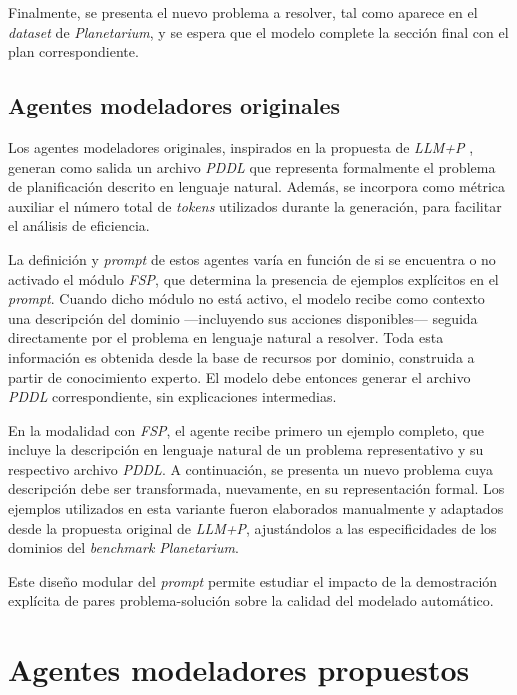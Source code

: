 Finalmente, se presenta el nuevo problema a resolver, tal como aparece en el \textit{dataset} de \textit{Planetarium}, y se espera que el modelo complete la sección final con el plan correspondiente.

\subsection{Agentes modeladores originales}

Los agentes modeladores originales, inspirados en la propuesta de \textit{LLM+P} \parencite{liu2023llm+}, generan como salida un archivo \textit{PDDL} que representa formalmente el problema de planificación descrito en lenguaje natural. Además, se incorpora como métrica auxiliar el número total de \textit{tokens} utilizados durante la generación, para facilitar el análisis de eficiencia.

La definición y \textit{prompt} de estos agentes varía en función de si se encuentra o no activado el módulo \textit{FSP}, que determina la presencia de ejemplos explícitos en el \textit{prompt}. Cuando dicho módulo no está activo, el modelo recibe como contexto una descripción del dominio —incluyendo sus acciones disponibles— seguida directamente por el problema en lenguaje natural a resolver. Toda esta información es obtenida desde la base de recursos por dominio, construida a partir de conocimiento experto. El modelo debe entonces generar el archivo \textit{PDDL} correspondiente, sin explicaciones intermedias.

En la modalidad con \textit{FSP}, el agente recibe primero un ejemplo completo, que incluye la descripción en lenguaje natural de un problema representativo y su respectivo archivo \textit{PDDL}. A continuación, se presenta un nuevo problema cuya descripción debe ser transformada, nuevamente, en su representación formal. Los ejemplos utilizados en esta variante fueron elaborados manualmente y adaptados desde la propuesta original de \textit{LLM+P}, ajustándolos a las especificidades de los dominios del \textit{benchmark Planetarium}.

Este diseño modular del \textit{prompt} permite estudiar el impacto de la demostración explícita de pares problema-solución sobre la calidad del modelado automático.

\section{Agentes modeladores propuestos}

